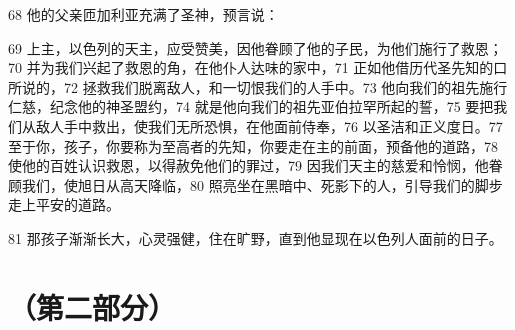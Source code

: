 68  他的父亲匝加利亚充满了圣神，预言说：\par

69  上主，以色列的天主，应受赞美，\newline{}因他眷顾了他的子民，为他们施行了救恩；\newline{}70  并为我们兴起了救恩的角，\newline{}在他仆人达味的家中，\newline{}71  正如他借历代圣先知的口所说的，\newline{}72  拯救我们脱离敌人，\newline{}和一切恨我们的人手中。\newline{}73  他向我们的祖先施行仁慈，\newline{}纪念他的神圣盟约，\newline{}74  就是他向我们的祖先亚伯拉罕所起的誓，\newline{}75  要把我们从敌人手中救出，\newline{}使我们无所恐惧，在他面前侍奉，\newline{}76  以圣洁和正义度日。\newline{}77  至于你，孩子，你要称为至高者的先知，\newline{}你要走在主的前面，预备他的道路，\newline{}78  使他的百姓认识救恩，\newline{}以得赦免他们的罪过，\newline{}79  因我们天主的慈爱和怜悯，\newline{}他眷顾我们，使旭日从高天降临，\newline{}80  照亮坐在黑暗中、死影下的人，\newline{}引导我们的脚步走上平安的道路。\par

81 那孩子渐渐长大，心灵强健，住在旷野，直到他显现在以色列人面前的日子。\par



\section{（第二部分）}


